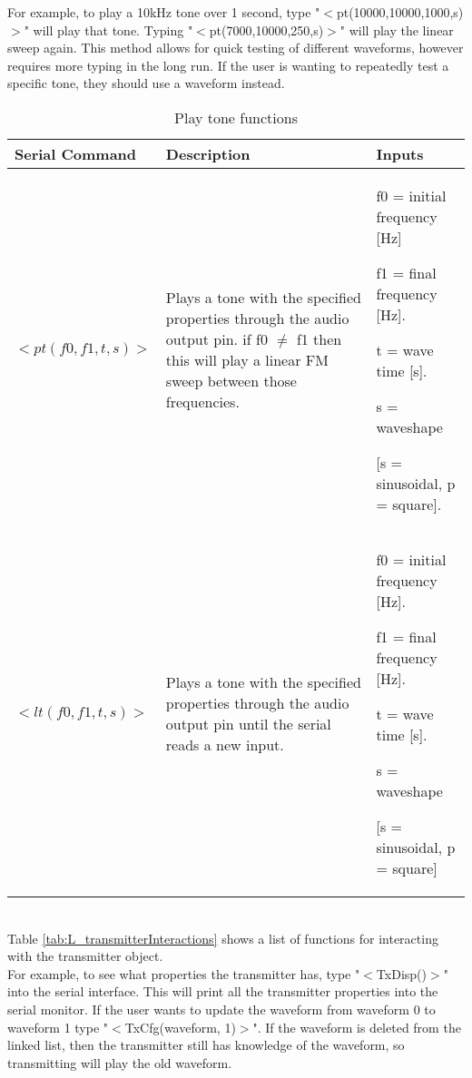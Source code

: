 For example, to play a 10kHz tone over 1 second, type "$<$pt(10000,10000,1000,s)$>$" will play that tone. Typing "$<$pt(7000,10000,250,s)$>$" will play the linear sweep again. This method allows for quick testing of different waveforms, however requires more typing in the long run. If the user is wanting to repeatedly test a specific tone, they should use a waveform instead. \\
\begin{table} [!htb]
	\caption{Play tone functions}
	\label{tab:L_toneInteractions}
	\centering
	\begin{tabular}{ |m{}|m{}|m{}| } 
		\hline
		Serial Command & Description & Inputs \\ 
		\hline
		\hline
		\centering $<pt(f0,f1,t,s)>$ & Plays a tone with the specified properties through the audio output pin. if f0 $\neq$ f1 then this will play a linear FM sweep between those frequencies. & f0 = initial frequency [Hz]
		
		f1 = final frequency [Hz].
		
		t = wave time [s].
		
		s = waveshape 
		
		[s = sinusoidal, p = square]. \\
		
		\hline
		\centering $<lt(f0,f1,t,s)>$ & Plays a tone with the specified properties through the audio output pin until the serial reads a new input. & f0 = initial frequency [Hz].
		
		f1 = final frequency [Hz].
		
		t = wave time [s].
		
		s = waveshape 
		
		[s = sinusoidal, p = square] \\
		
		\hline
		
	\end{tabular}
\end{table} \\
\pagebreak
Table \ref{tab:L_transmitterInteractions} shows a list of functions for interacting with the transmitter object. \\

For example, to see what properties the transmitter has, type "$<$TxDisp()$>$" into the serial interface. This will print all the transmitter properties into the serial monitor. If the user wants to update the waveform from waveform 0 to waveform 1 type "$<$TxCfg(waveform, 1)$>$". If the waveform is deleted from the linked list, then the transmitter still has knowledge of the waveform, so transmitting will play the old waveform. \\

